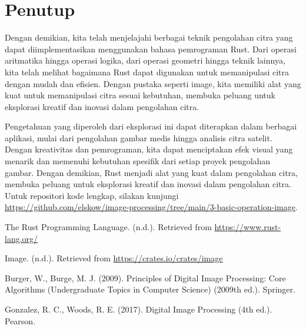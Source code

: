 \documentclass[a4paper,12pt,openany]{book}
\begin{document}
\chapter{Penutup}

Dengan demikian, kita telah menjelajahi berbagai teknik pengolahan citra yang dapat diimplementasikan menggunakan bahasa pemrograman Rust. Dari operasi aritmatika hingga operasi logika, dari operasi geometri hingga teknik lainnya, kita telah melihat bagaimana Rust dapat digunakan untuk memanipulasi citra dengan mudah dan efisien. Dengan pustaka seperti image, kita memiliki alat yang kuat untuk memanipulasi citra sesuai kebutuhan, membuka peluang untuk eksplorasi kreatif dan inovasi dalam pengolahan citra.

Pengetahuan yang diperoleh dari eksplorasi ini dapat diterapkan dalam berbagai aplikasi, mulai dari pengolahan gambar medis hingga analisis citra satelit. Dengan kreativitas dan pemrograman, kita dapat menciptakan efek visual yang menarik dan memenuhi kebutuhan spesifik dari setiap proyek pengolahan gambar. Dengan demikian, Rust menjadi alat yang kuat dalam pengolahan citra, membuka peluang untuk eksplorasi kreatif dan inovasi dalam pengolahan citra. Untuk repositori kode lengkap, silakan kunjungi \url{https://github.com/elskow/image-processing/tree/main/3-basic-operation-image}.

\renewcommand{\bibname}{Daftar Pustaka}
\begin{thebibliography}{9}

    The Rust Programming Language. (n.d.). Retrieved from \url{https://www.rust-lang.org/}

    Image. (n.d.). Retrieved from \url{https://crates.io/crates/image}

    Burger, W., Burge, M. J. (2009). Principles of Digital Image Processing: Core Algorithms (Undergraduate Topics in Computer Science) (2009th ed.). Springer.

    Gonzalez, R. C., Woods, R. E. (2017). Digital Image Processing (4th ed.). Pearson.

\end{thebibliography}
\end{document}
